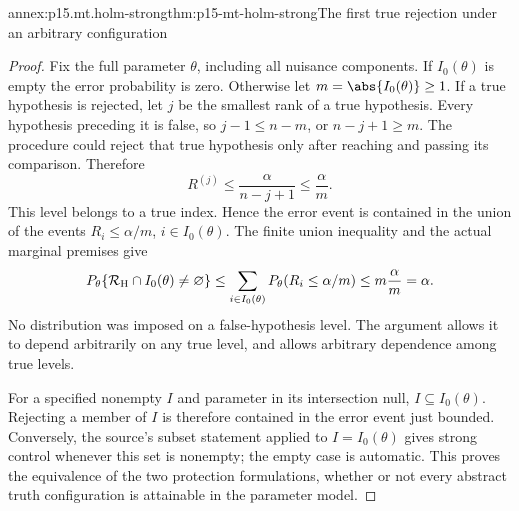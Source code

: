 \begin{annexitem}{annex:p15.mt.holm-strong}{thm:p15-mt-holm-strong}{The first true rejection under an arbitrary configuration}
\begin{proof}
Fix the full parameter \(\theta\), including all nuisance components.
If \(I_0(\theta)\) is empty the error probability is zero. Otherwise
let \(m=\abs{I_0(\theta)}\geq1\).
If a true hypothesis is rejected, let \(j\) be the smallest rank of a
true hypothesis. Every hypothesis preceding it is false, so
\(j-1\leq n-m\), or \(n-j+1\geq m\).
The procedure could reject that true hypothesis only after reaching and
passing its comparison. Therefore
\[
 R^{(j)}\leq\frac{\alpha}{n-j+1}\leq\frac{\alpha}{m}.
\]
This level belongs to a true index. Hence the error event is contained
in the union of the events \(R_i\leq\alpha/m\), \(i\in I_0(\theta)\).
The finite union inequality and the actual marginal premises give
\[
 P_\theta\{\mathcal R_{\rm H}\cap I_0(\theta)\ne\varnothing\}
 \leq\sum_{i\in I_0(\theta)}P_\theta(R_i\leq\alpha/m)
 \leq m\frac{\alpha}{m}=\alpha.
\]
No distribution was imposed on a false-hypothesis level. The argument
allows it to depend arbitrarily on any true level, and allows arbitrary
dependence among true levels.

For a specified nonempty \(I\) and parameter in its intersection null,
\(I\subseteq I_0(\theta)\). Rejecting a member of \(I\) is therefore
contained in the error event just bounded. Conversely, the source's
subset statement applied to \(I=I_0(\theta)\) gives strong control
whenever this set is nonempty; the empty case is automatic. This proves
the equivalence of the two protection formulations, whether or not
every abstract truth configuration is attainable in the parameter model.
\end{proof}
\end{annexitem}

